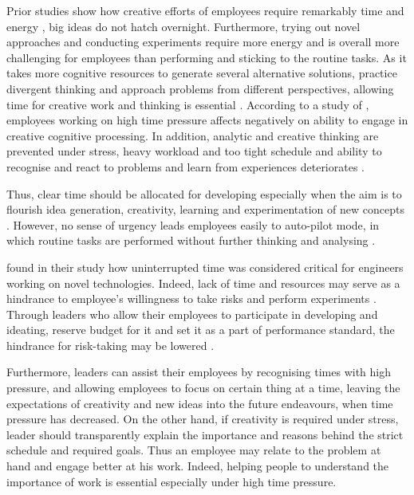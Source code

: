 Prior studies show how creative efforts of employees require remarkably time and energy \citep{gardner1988creativity,getzels1975problem}, big ideas do not hatch overnight. Furthermore, trying out novel approaches and conducting experiments require more energy and is overall more challenging for employees than performing and sticking to the routine tasks. As it takes more cognitive resources to generate several alternative solutions, practice divergent thinking and approach problems from different perspectives, allowing time for creative work and thinking is essential \citep{amabile2002creativity,shalley2004leaders}. According to a study of \citet{amabile2002creativity}, employees working on high time pressure affects negatively on ability to engage in creative cognitive processing. In addition, analytic and creative thinking are prevented under stress, heavy workload and too tight schedule and ability to recognise and react to problems and learn from experiences deteriorates \citep{garvin2008yours}.

Thus, clear time should be allocated for developing especially when the aim is to flourish idea generation, creativity, learning and experimentation of new concepts \citep{amabile2002creativity,redmond1993putting,amabile1987creativit}. However, no sense of urgency leads employees easily to auto-pilot mode, in which routine tasks are performed without further thinking and analysing \citep{amabile2002creativity}. 

\citet{katz1985project} found in their study how uninterrupted time was considered critical for engineers working on novel technologies. Indeed, lack of time and resources may serve as a hindrance to employee's willingness to take risks and perform experiments \citep{jung2003role}. Through leaders who allow their employees to participate in developing and ideating, reserve budget for it and set it as a part of performance standard, the hindrance for risk-taking may be lowered \citep{jung2003role}.
 
Furthermore, leaders can assist their employees by recognising times with high pressure, and allowing employees to focus on certain thing at a time, leaving the expectations of creativity and new ideas into the future endeavours, when time pressure has decreased. On the other hand, if creativity is required under stress, leader should transparently explain the importance and reasons behind the strict schedule and required goals. Thus an employee may relate to the problem at hand and engage better at his work. Indeed, helping people to understand the importance of work is essential especially under high time pressure. \citep{amabile2002creativity}

